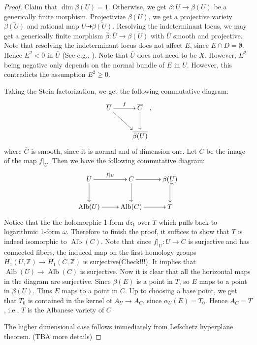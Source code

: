 \documentclass[a4paper,12pt,reqno]{amsart}
\theoremstyle{plain}
\theoremstyle{remark}
\newcommand{\Z}{\mathbb Z}
\newcommand{\C}{\mathbb C}
\newcommand{\Alb}{\operatorname{Alb}}
\begin{document}
\begin{proof}
Claim that $\dim\beta(U)=1$. Otherwise, we get $\beta: U\to \beta(U)$ be a generically finite morphism. Projectivize $\beta(U)$, we get a projective variety $\overline{\beta(U)}$ and rational map $U\dasharrow \overline{\beta(U)}$. Resolving the indeterminant locus, we may get a generically finite morphism $\overline{\beta}:\overline{U}\to\overline{\beta(U)}$ with $\overline{U}$ smooth and projective. %
Note that resolving the indeterminant locus does not affect $E$, since $E\cap D=\emptyset$. Hence $E^2<0$ in $\overline{U}$ (See e.g., \cite[Theorem 10.1]{KK}). Note that $\overline{U}$ does not need to be $X$. However, $E^2$ being negative only depends on the normal bundle of $E$ in $U$. However, this contradicts the assumption $E^2\geq 0$. 

Taking the Stein factorization, we get the following commutative diagram:
$$\xymatrix{
\overline{U} \ar[rd] \ar[r]^f & \overline{ C} \ar[d]  \\
& \overline{\beta(U)}
},$$
 where $\overline{C}$ is smooth, since it is normal and of dimension one. Let $C$ be the image of the map $f|_U$. Then we have the following commutative diagram:
 $$ \xymatrix{
U \ar[r]^{f|_U} \ar[d] & C \ar[r] \ar[d] & \beta(U) \ar@{^{(}->}[d] \\ 
\Alb(U) \ar[r] & \Alb(C) \ar[r] & T }
 $$
Notice that the the holomorphic 1-form $dz_1$ over $T$ which pulls back to logarithmic 1-form $\omega$. Therefore to finish the proof, it suffices to show that $T$ is indeed isomorphic to $\Alb(C)$. 
Note that since $f|_U:U\to C$ is surjective and has connected fibers, the induced map on the first homology groups $H_1(U,\Z) \to H_1(C,\Z)$ is surjective{\color{red}(Check!!!)}. It implies that $\Alb(U) \to \Alb(C)$ is surjective. Now it is clear that all the horizontal maps in the diagram are surjective. 
Since $\beta(E)$ is a point in $T$, so $E$ maps to a point in $\beta(U)$. Thus $E$ maps to a point in $C$. Up to choosing a base point, we get that $ T_0$ is contained in the kernel of $A_U \to A_C$, since $\alpha_U(E)=T_0$. Hence $A_C=T$, i.e., $T$ is the Albanese variety of $C$




The higher dimensional case follows immediately from Lefschetz hyperplane theorem. (TBA more details)
\end{proof}
\end{document}
